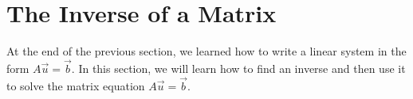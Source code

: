 %
%
%
%
%
%
%
%
%
%

\vfill \pagebreak
\section{The Inverse of a Matrix}
\label{sect:matrix:inverse}

At the end of the previous section, we learned how to write a linear system in the form $A\vec{u}=\vec{b}$.  In this section, we will learn how to find an inverse and then use it to solve the matrix equation $A\vec{u}=\vec{b}$.

